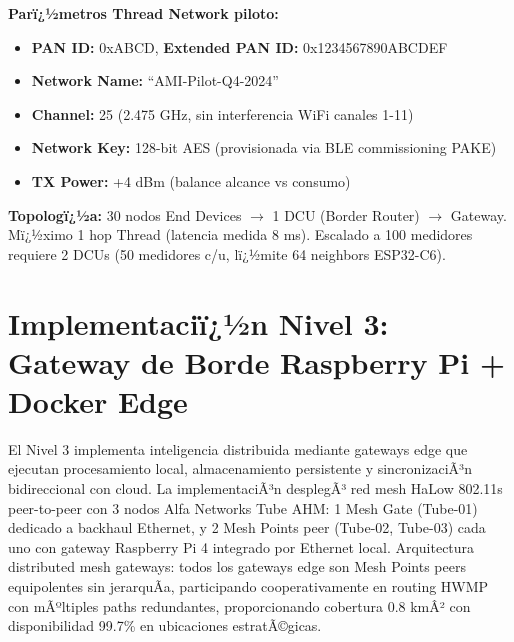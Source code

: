 \textbf{Parï¿½metros Thread Network piloto:}
\begin{itemize}
    \item \textbf{PAN ID:} 0xABCD, \textbf{Extended PAN ID:} 0x1234567890ABCDEF
    \item \textbf{Network Name:} ``AMI-Pilot-Q4-2024''
    \item \textbf{Channel:} 25 (2.475 GHz, sin interferencia WiFi canales 1-11)
    \item \textbf{Network Key:} 128-bit AES (provisionada via BLE commissioning PAKE)
    \item \textbf{TX Power:} +4 dBm (balance alcance vs consumo)
\end{itemize}

\textbf{Topologï¿½a:} 30 nodos End Devices $\rightarrow$ 1 DCU (Border Router) $\rightarrow$ Gateway. Mï¿½ximo 1 hop Thread (latencia medida 8 ms). Escalado a 100 medidores requiere 2 DCUs (50 medidores c/u, lï¿½mite 64 neighbors ESP32-C6).

\section{Implementaciï¿½n Nivel 3: Gateway de Borde Raspberry Pi + Docker Edge}
\label{sec:impl-nivel3-gateway}

El Nivel 3 implementa inteligencia distribuida mediante gateways edge que ejecutan procesamiento local, almacenamiento persistente y sincronizaciÃ³n bidireccional con cloud. La implementaciÃ³n desplegÃ³ red mesh HaLow 802.11s peer-to-peer con 3 nodos Alfa Networks Tube AHM: 1 Mesh Gate (Tube-01) dedicado a backhaul Ethernet, y 2 Mesh Points peer (Tube-02, Tube-03) cada uno con gateway Raspberry Pi 4 integrado por Ethernet local. Arquitectura distributed mesh gateways: todos los gateways edge son Mesh Points peers equipolentes sin jerarquÃ­a, participando cooperativamente en routing HWMP con mÃºltiples paths redundantes, proporcionando cobertura 0.8 kmÂ² con disponibilidad 99.7\% en ubicaciones estratÃ©gicas.

